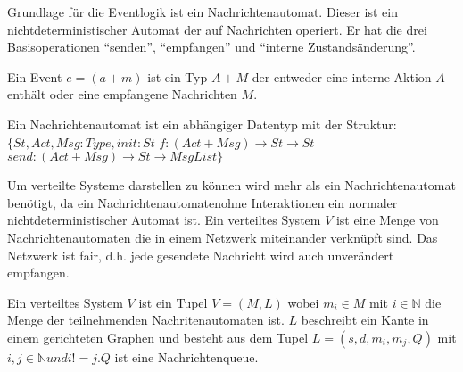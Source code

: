 
Grundlage für die Eventlogik ist ein Nachrichtenautomat. Dieser ist ein
nichtdeterministischer Automat der auf Nachrichten operiert.
Er hat die drei Basisoperationen ``senden'', ``empfangen'' und ``interne
Zustandsänderung''.~\cite{bickford2003logic}

\begin{defi}
  Ein Event $e=(a+m)$ ist ein Typ $A+M$ der entweder eine interne Aktion $A$ enthält
  oder eine empfangene Nachrichten $M$.
\end{defi}

\begin{defi}
  Ein Nachrichtenautomat ist ein abhängiger Datentyp mit der Struktur:
  $\{St, Act, Msg: Type, init: St$
    $f:(Act+Msg)\rightarrow St\rightarrow St$
    $send:(Act+Msg)\rightarrow St\rightarrow MsgList\}$  
\end{defi}

Um verteilte Systeme darstellen zu können wird mehr als ein Nachrichtenautomat
benötigt, da ein Nachrichtenautomatenohne Interaktionen ein normaler
nichtdeterministischer Automat ist. Ein verteiltes System $V$ ist eine Menge von
Nachrichtenautomaten die in einem Netzwerk miteinander verknüpft sind.
Das Netzwerk ist fair, d.h. jede gesendete Nachricht wird auch unverändert
empfangen.~\cite{bickford2003logic}

\begin{defi}
  Ein verteiltes System $V$ ist ein Tupel $V=(M,L)$ wobei $m_i\in M$ mit $i\in
  \mathbb{N}$ die Menge der teilnehmenden Nachritenautomaten ist. $L$ beschreibt
  ein Kante in einem gerichteten Graphen und besteht aus dem Tupel $L=(s,d,m_i,m_j,Q)$ 
  mit $i,j\in \mathbb{N} und i!= j.Q$ ist eine Nachrichtenqueue.
\end{defi}
